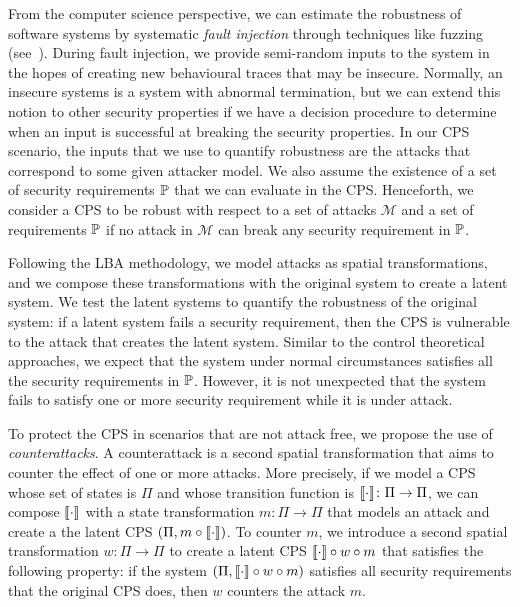 {From the computer science perspective, we can estimate the robustness of software systems by systematic \emph{fault injection} through techniques like fuzzing (see~\cite{Fuzzing}).  
During fault injection, we provide semi-random inputs to the system in the hopes of creating new behavioural traces that may be insecure.  %
Normally, an insecure systems is a system with abnormal termination, but we can extend this notion to other security properties if we have a decision procedure to determine when an input is successful at breaking the security properties. In our CPS scenario, the inputs that we use to quantify robustness are the attacks that correspond to some given attacker model. We also assume the existence of a set of security requirements $\mathbb{P}$ that we can evaluate in the CPS. Henceforth, we consider a CPS to be robust with respect to a set of attacks $\mathcal{M}$ and a set of requirements $\mathbb{P}$ if no attack in $\mathcal{M}$ can break any security requirement in $\mathbb{P}$. 

Following the LBA methodology, we model attacks as spatial transformations, and we compose these transformations with the original system to create a latent system. We test the latent systems to quantify the robustness of the original system: if a latent system fails a security requirement, then the CPS is vulnerable to the attack that creates the latent system. Similar to the control theoretical approaches, we expect that the system under normal circumstances satisfies all the security requirements in $\mathbb{P}$. However, it is not unexpected that the system fails to satisfy one or more security requirement while it is under attack. 

To protect the CPS in scenarios that are not attack free, we propose the use of \emph{counterattacks}. A counterattack is a second spatial transformation that aims to counter the effect of one or more attacks. More precisely, if we model a CPS whose set of states is $\Pi$ and whose transition function is ${{{\llbracket\cdot\rrbracket}}}\colon\Pi\rightarrow\Pi$, we can compose ${{{\llbracket\cdot\rrbracket}}}$ with a state transformation $m\colon \Pi\rightarrow\Pi$ that models an attack and create a the latent CPS $(\Pi,m\circ {{{\llbracket\cdot\rrbracket}}})$. To counter $m$, we introduce a second spatial transformation $w\colon \Pi\rightarrow \Pi$ to create a latent CPS ${{{\llbracket\cdot\rrbracket}}}\circ w\circ m$ that satisfies the following property: if the system $(\Pi,{{{\llbracket\cdot\rrbracket}}}\circ w\circ m)$ satisfies all security requirements that the original CPS does, then $w$ counters the attack $m$.

}

